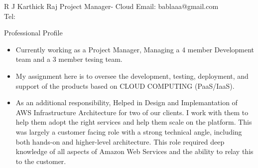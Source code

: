 \documentclass[a4paper,12pt]{article}
\begin{document}
\setmainfont



\vspace*{3\baselineskip}

\header
{R J Karthick Raj}
{Project Manager- Cloud}
{Email: bablaaa@gmail.com\\
Tel: }
\newline
\newline

\begin{resumesummary}{Professional Profile}
\begin{itemize}      
  \item Currently working as a Project Manager, Managing a 4 member Development team and a 3 member tesing team.
  \item My assignment here is to oversee the development, testing, deployment, and support of the products based on CLOUD COMPUTING (PaaS/IaaS). 
  \item As an additional responsibility, Helped in Design and Implemantation of AWS Infrastructure Architecture for two of our clients. I work with them to 
help them adopt the right services and help them scale on the platform. This was largely a customer facing role with a strong technical angle, including both hands-on and higher-level architecture. This role required deep knowledge of all aspects of Amazon Web Services and the ability to relay this to the customer.
\newline
\end{itemize}
\end{resumesummary}

\end{document}
